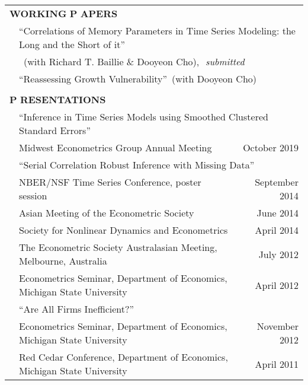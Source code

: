 \documentclass[10pt]{article}
\begin{document}
\begin{center}
\begin{tabular}{llllr}
\multicolumn{5}{l}{{\Large \textbf{W}}\textbf{ORKING} {\Large \textbf{P}}%
\textbf{APERS}} \vspace{0.1cm}\\
& \multicolumn{4}{l}{\textquotedblleft Correlations of Memory Parameters in Time Series Modeling: the Long and the Short of it\textquotedblright \ } \vspace{0.1cm}\\
&\multicolumn{4}{l}{\,\,\,(with Richard T. Baillie \& Dooyeon Cho),\,\, \emph{submitted}}\vspace{0.1cm}\\
& \multicolumn{4}{l}{\textquotedblleft Reassessing Growth Vulnerability\textquotedblright \ (with Dooyeon Cho)} \\
\multicolumn{5}{p{500pt}}{}\\
\multicolumn{5}{l}{{\Large \textbf{P}}
\textbf{RESENTATIONS}}\vspace{0.1cm}\\
&\multicolumn{4}{l}{\textquotedblleft Inference in Time Series Models using Smoothed Clustered Standard Errors\textquotedblright } \\
\multicolumn{1}{l}{} &  \multicolumn{3}{l}{
Midwest Econometrics Group Annual Meeting} &\multicolumn{1}{r}{October 2019}\vspace{0.2cm}\\
&\multicolumn{4}{l}{\textquotedblleft Serial Correlation
Robust Inference with Missing Data\textquotedblright } \\
\multicolumn{1}{l}{} &  \multicolumn{3}{l}{
NBER/NSF Time Series Conference, poster session} &\multicolumn{1}{r}{September 2014}\\
\multicolumn{1}{l}{} & \multicolumn{3}{l}{
Asian Meeting of the Econometric Society} &\multicolumn{1}{r}{June 2014}\\
\multicolumn{1}{l}{} &\multicolumn{3}{l}{
Society for Nonlinear Dynamics and Econometrics} &\multicolumn{1}{r}{April 2014}\\
\multicolumn{1}{l}{} & \multicolumn{3}{l}{
The Econometric Society Australasian Meeting, Melbourne, Australia} &\multicolumn{1}{r}{July 2012}\\
\multicolumn{1}{l}{} &\multicolumn{3}{l}{
Econometrics Seminar, Department of Economics, Michigan State University} &\multicolumn{1}{r}{April 2012}\vspace{0.2cm}\\
& \multicolumn{4}{l}{ \textquotedblleft Are All Firms Inefficient?\textquotedblright}\\
\multicolumn{1}{l}{} & \multicolumn{3}{l}{
Econometrics Seminar, Department of Economics, Michigan State University} &\multicolumn{1}{r}{November 2012}\\
\multicolumn{1}{l}{} & \multicolumn{3}{l}{
Red Cedar Conference, Department of Economics, Michigan State University} &\multicolumn{1}{r}{April 2011} \\
\end{tabular}


\end{center}
\end{document}
